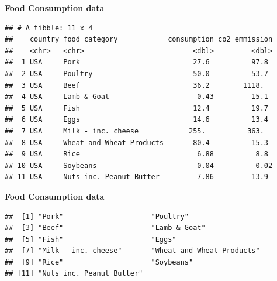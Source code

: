 \documentclass[ignorenonframetext,]{beamer}
\newenvironment{Shaded}{\begin{snugshade}}{\end{snugshade}}
\newcommand{\KeywordTok}[1]{\textcolor[rgb]{0.13,0.29,0.53}{\textbf{#1}}}
\newcommand{\NormalTok}[1]{#1}
\newcommand{\OperatorTok}[1]{\textcolor[rgb]{0.81,0.36,0.00}{\textbf{#1}}}
\newcommand{\StringTok}[1]{\textcolor[rgb]{0.31,0.60,0.02}{#1}}
\begin{document}
\begin{frame}[fragile]{}
\protect\hypertarget{section-6}{}

\textbf{\large Food Consumption data}

\vspace{1ex}\scriptsize

\begin{Shaded}
\end{Shaded}

\begin{verbatim}
## # A tibble: 11 x 4
##    country food_category            consumption co2_emmission
##    <chr>   <chr>                          <dbl>         <dbl>
##  1 USA     Pork                           27.6          97.8 
##  2 USA     Poultry                        50.0          53.7 
##  3 USA     Beef                           36.2        1118.  
##  4 USA     Lamb & Goat                     0.43         15.1 
##  5 USA     Fish                           12.4          19.7 
##  6 USA     Eggs                           14.6          13.4 
##  7 USA     Milk - inc. cheese            255.          363.  
##  8 USA     Wheat and Wheat Products       80.4          15.3 
##  9 USA     Rice                            6.88          8.8 
## 10 USA     Soybeans                        0.04          0.02
## 11 USA     Nuts inc. Peanut Butter         7.86         13.9
\end{verbatim}

\end{frame}

\begin{frame}[fragile]{}
\protect\hypertarget{section-7}{}

\textbf{\large Food Consumption data}

\vspace{1ex}\scriptsize

\begin{Shaded}
\end{Shaded}

\begin{verbatim}
##  [1] "Pork"                     "Poultry"                 
##  [3] "Beef"                     "Lamb & Goat"             
##  [5] "Fish"                     "Eggs"                    
##  [7] "Milk - inc. cheese"       "Wheat and Wheat Products"
##  [9] "Rice"                     "Soybeans"                
## [11] "Nuts inc. Peanut Butter"
\end{verbatim}

\end{frame}
\end{document}
